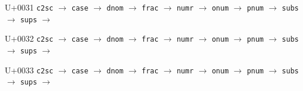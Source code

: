\documentclass{article}
\begin{document}
\begin{substitutions}
\goodbreak

U+0031  \linebreak
    \texttt{c2sc} $\to$  \linebreak
    \texttt{case} $\to$  \linebreak
    \texttt{dnom} $\to$  \linebreak
    \texttt{frac} $\to$  \linebreak
    \texttt{numr} $\to$  \linebreak
    \texttt{onum} $\to$  \linebreak
    \texttt{pnum} $\to$  \linebreak
    \texttt{subs} $\to$  \linebreak
    \texttt{sups} $\to$  

\goodbreak

U+0032  \linebreak
    \texttt{c2sc} $\to$  \linebreak
    \texttt{case} $\to$  \linebreak
    \texttt{dnom} $\to$  \linebreak
    \texttt{frac} $\to$  \linebreak
    \texttt{numr} $\to$  \linebreak
    \texttt{onum} $\to$  \linebreak
    \texttt{pnum} $\to$  \linebreak
    \texttt{subs} $\to$  \linebreak
    \texttt{sups} $\to$  

\goodbreak

U+0033  \linebreak
    \texttt{c2sc} $\to$  \linebreak
    \texttt{case} $\to$  \linebreak
    \texttt{dnom} $\to$  \linebreak
    \texttt{frac} $\to$  \linebreak
    \texttt{numr} $\to$  \linebreak
    \texttt{onum} $\to$  \linebreak
    \texttt{pnum} $\to$  \linebreak
    \texttt{subs} $\to$  \linebreak
    \texttt{sups} $\to$  


\end{substitutions}
\end{document}
